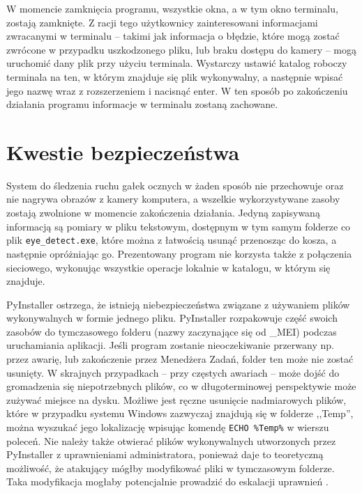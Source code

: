 \documentclass[a4paper,twoside,12pt]{book}
\begin{document}
W momencie zamknięcia programu, wszystkie okna, a w tym okno terminalu, zostają zamknięte. Z racji tego użytkownicy zainteresowani informacjami zwracanymi w terminalu -- takimi jak informacja o błędzie, które mogą zostać zwrócone w przypadku uszkodzonego pliku, lub braku dostępu do kamery -- mogą uruchomić dany plik przy użyciu terminala. Wystarczy ustawić katalog roboczy terminala na ten, w którym znajduje się plik wykonywalny, a następnie wpisać jego nazwę wraz z rozszerzeniem i nacisnąć enter. W ten sposób po zakończeniu działania programu informacje w terminalu zostaną zachowane.

\section{Kwestie bezpieczeństwa}
\label{sec:Kwestie-bezpieczenstwa}

System do śledzenia ruchu gałek ocznych w żaden sposób nie przechowuje oraz nie nagrywa obrazów z kamery komputera, a wszelkie wykorzystywane zasoby zostają zwolnione w momencie zakończenia działania. Jedyną zapisywaną informacją są pomiary w pliku tekstowym, dostępnym w tym samym folderze co plik \texttt{eye\_\-detect.exe}, które można z łatwością usunąć przenosząc do kosza, a następnie opróżniając go. Prezentowany program nie korzysta także z połączenia sieciowego, wykonując wszystkie operacje lokalnie w katalogu, w którym się znajduje. 

PyInstaller ostrzega, że istnieją niebezpieczeństwa związane z używaniem plików wykonywalnych w formie jednego pliku. PyInstaller rozpakowuje część swoich zasobów do tymczasowego folderu (nazwy zaczynające się od \_MEI) podczas uruchamiania aplikacji. Jeśli program zostanie nieoczekiwanie przerwany np. przez awarię, lub zakończenie przez Menedżera Zadań, folder ten może nie zostać usunięty. W skrajnych przypadkach -- przy częstych awariach -- może dojść do gromadzenia się niepotrzebnych plików, co w długoterminowej perspektywie może zużywać miejsce na dysku. Możliwe jest ręczne usunięcie nadmiarowych plików, które w przypadku systemu Windows zazwyczaj znajdują się w folderze ,,Temp'', można wyszukać jego lokalizację wpisując komendę \texttt{ECHO \-\%Temp\%} w wierszu poleceń. Nie należy także otwierać plików wykonywalnych utworzonych przez PyInstaller z uprawnieniami administratora, ponieważ daje to teoretyczną możliwość, że atakujący mógłby modyfikować pliki w tymczasowym folderze. Taka modyfikacja mogłaby potencjalnie prowadzić do eskalacji uprawnień \cite{bib:PyInstaller-how-it-works}.
\end{document}
